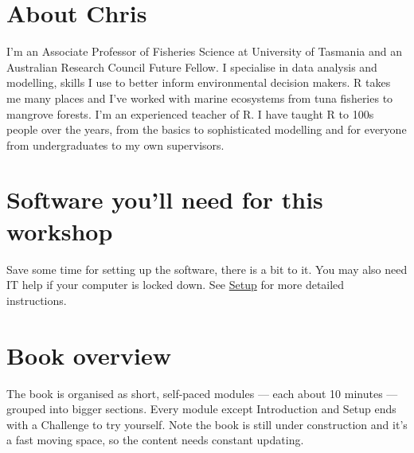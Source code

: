 \documentclass[
  letterpaper,
  DIV=11,
  numbers=noendperiod]{scrreprt}
\begin{document}
\section{About Chris}\label{about-chris}

I'm an Associate Professor of Fisheries Science at University of
Tasmania and an Australian Research Council Future Fellow. I specialise
in data analysis and modelling, skills I use to better inform
environmental decision makers. R takes me many places and I've worked
with marine ecosystems from tuna fisheries to mangrove forests. I'm an
experienced teacher of R. I have taught R to 100s people over the years,
from the basics to sophisticated modelling and for everyone from
undergraduates to my own supervisors.

\section{Software you'll need for this
workshop}\label{software-youll-need-for-this-workshop}

Save some time for setting up the software, there is a bit to it. You
may also need IT help if your computer is locked down. See
\href{02-setup.qmd}{Setup} for more detailed instructions.

\section{Book overview}\label{book-overview}

The book is organised as short, self-paced modules --- each about 10
minutes --- grouped into bigger sections. Every module except
Introduction and Setup ends with a Challenge to try yourself. Note the
book is still under construction and it's a fast moving space, so the
content needs constant updating.
\end{document}
